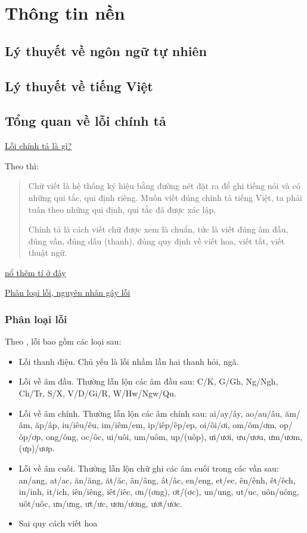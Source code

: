 \documentclass[a4paper,oneside]{book} %
\newcommand{\note}[1]{\underline{#1}}
\begin{document}
\chapter{Thông tin nền}
\label{cha:background}


\section{Lý thuyết về ngôn ngữ tự nhiên}
\label{sec:natural-language}

\section{Lý thuyết về tiếng Việt}
\label{sec:Vietnamese}



\section{Tổng quan về lỗi chính tả}

\note{Lỗi chính tả là gì?}

Theo \cite{LoiChinhTa} thì:
\begin{verse}
  Chữ viết là hệ thống ký hiệu bằng đường nét đặt ra để ghi tiếng nói
  và có những qui tắc, qui định riêng. Muốn viết đúng chính tả tiếng
  Việt, ta phải tuân theo những qui định, qui tắc đã được xác lập.

  Chính tả là cách viết chữ được xem là chuẩn, tức là viết đúng âm
  đầu, đúng vần, đúng dấu (thanh), đúng quy định về viết hoa, viết
  tắt, viết thuật ngữ.
\end{verse}

\note{nổ thêm tí ở đây}

\note{Phân loại lỗi, nguyên nhân gây lỗi}

\subsection{Phân loại lỗi}

Theo \cite{LoiChinhTa}, lỗi bao gồm các loại sau:
\begin{itemize}
\item Lỗi thanh điệu. Chủ yếu là lỗi nhầm lẫn hai thanh hỏi, ngã.
\item Lỗi về âm đầu. Thường lẫn lộn các âm đầu sau: C/K, G/Gh, Ng/Ngh,
  Ch/Tr, S/X, V/D/Gi/R, W/Hw/Ngw/Qu.
\item Lỗi về âm chính. Thường lẫn lộn các âm chính sau: ai/ay/ây,
  ao/au/âu, ăm/âm, ăp/âp, iu/iêu/êu, im/iêm/em, ip/iêp/êp/ep,
  oi/ôi/ơi, om/ôm/ơm, op/ôp/ơp, ong/ông, oc/ôc, ui/uôi, um/uôm, up/(uôp),
  ưi/ươi, ưu/ươu, ưm/ươm, (ưp)/ươp.
\item Lỗi về âm cuối. Thường lẫn lộn chữ ghi các âm cuối trong các vần
  sau:
  an/ang, at/ac, ăn/ăng, ăt/ăc, ân/âng, ât/âc, en/eng, et/ec, ên/ênh,
  êt/êch, in/inh, it/ich, iên/iêng, iêt/iêc, ơn/(ơng), ơt/(ơc),
  un/ung, ut/uc, uôn/uông, uôt/uôc, ưn/ưng, ưt/ưc, ươn/ương, ươt/ươc.
\item Sai quy cách viết hoa
\end{itemize}
\end{document}

